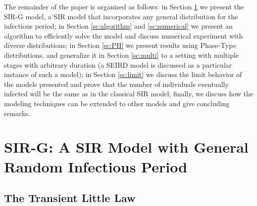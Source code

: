 \documentclass[USenglish,10pt]{article}
\begin{document}

The remainder of the paper is organized as follows: in Section \ref{sc:model} we present the SIR-G model, a SIR model that incorporates any general distribution for the infectious period; in Section \ref{sc:algorithm} and \ref{sc:numerical} we present an algorithm to efficiently solve the model and discuss numerical experiment with diverse distributions; in Section \ref{sc:PH} we present results using Phase-Type distributions, and generalize it in Section \ref{sc:multi} to a setting with multiple stages with arbitrary duration (a SEIRD model is discussed as a particular instance of such a model); in Section \ref{sc:limit} we discuss the limit behavior of the models presented and prove that the number of individuals eventually infected will be the same as in the classical SIR model; finally, we discuss how the modeling techniques can be extended to other models and give concluding remarks.



\section{SIR-G: A SIR Model with General Random Infectious Period}\label{sc:model}



\subsection{The Transient Little Law}
\end{document}
